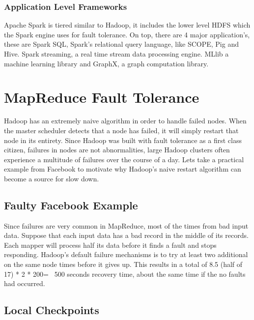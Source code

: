 \documentclass[10pt,twocolumn]{IEEEtran11}
\begin{document}
\subsubsection{Application Level Frameworks}
Apache Spark is tiered similar to Hadoop, it includes the lower level HDFS which the Spark engine uses for fault tolerance.  On top, there are 4 major application's, these are Spark SQL, Spark's relational query language, like SCOPE, Pig and Hive.  Spark streaming, a real time stream data processing engine.  MLlib a machine learning library and GraphX, a graph computation library.

\section{MapReduce Fault Tolerance}

Hadoop has an extremely naive algorithm in order to handle failed nodes.   When the master scheduler detects that a node has failed, it will simply restart that node in its entirety.  Since Hadoop was built with fault tolerance as a first class citizen, failures in nodes are not abnormalities, large Hadoop clusters often experience a multitude of  failures over the course of a day.  Lets take a practical example from Facebook to motivate why Hadoop's naive restart algorithm can become a source for slow down.

\subsection{Faulty Facebook Example}

Since failures are very common in MapReduce, most of the times from bad input data.  Suppose that each input data has a bad record in the middle of its records.  Each mapper will process half its data before it finds a fault and stops responding.  Hadoop's default failure mechanisms is to try at least two additional on the same node times before it gives up.  This results in a total of 8.5 (half of 17) * 2 * 200= ~500 seconds recovery time, about the same time if the no faults had occurred.

\subsection{Local Checkpoints}
\end{document}
